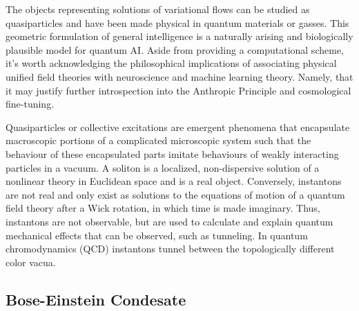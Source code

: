 \documentclass{article}
\begin{document}
    
    
    
    The objects representing solutions of variational flows can be studied as quasiparticles and have been made physical in quantum materials or gasses. This geometric formulation of general intelligence is a naturally arising and biologically plausible model for quantum AI. Aside from providing a computational scheme, it's worth acknowledging the philosophical implications of associating physical unified field theories with neuroscience and machine learning theory. Namely, that it  may justify further introspection into the Anthropic Principle and cosmological fine-tuning.
    
    Quasiparticles or collective excitations are emergent phenomena that encapsulate macroscopic portions of a complicated microscopic system such that the behaviour of these encapsulated parts imitate  behaviours of weakly interacting particles in a vacuum. 
    A soliton is a localized, non-dispersive solution of a nonlinear theory in Euclidean space and is a real object. Conversely, instantons are not real and only exist as solutions to the equations of motion of a quantum field theory after a Wick rotation, in which time is made imaginary. Thus, instantons are not observable, but are used to calculate and explain quantum mechanical effects that can be observed, such as tunneling. In quantum chromodynamics (QCD) instantons tunnel between the topologically different color vacua.
    
    \subsection{Bose-Einstein Condesate}
    
\end{document}
